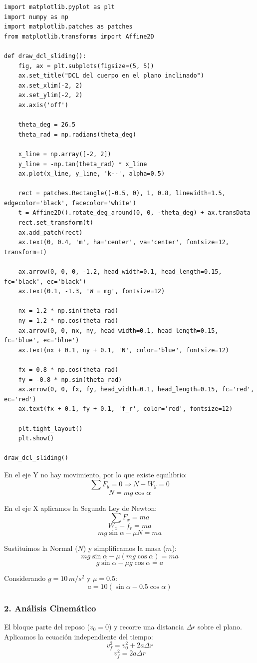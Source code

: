 \documentclass[12pt, a4paper]{article}
\begin{document}
\begin{lstlisting}
import matplotlib.pyplot as plt
import numpy as np
import matplotlib.patches as patches
from matplotlib.transforms import Affine2D

def draw_dcl_sliding():
    fig, ax = plt.subplots(figsize=(5, 5))
    ax.set_title("DCL del cuerpo en el plano inclinado")
    ax.set_xlim(-2, 2)
    ax.set_ylim(-2, 2)
    ax.axis('off')

    theta_deg = 26.5
    theta_rad = np.radians(theta_deg)

    x_line = np.array([-2, 2])
    y_line = -np.tan(theta_rad) * x_line
    ax.plot(x_line, y_line, 'k--', alpha=0.5)

    rect = patches.Rectangle((-0.5, 0), 1, 0.8, linewidth=1.5, edgecolor='black', facecolor='white')
    t = Affine2D().rotate_deg_around(0, 0, -theta_deg) + ax.transData
    rect.set_transform(t)
    ax.add_patch(rect)
    ax.text(0, 0.4, 'm', ha='center', va='center', fontsize=12, transform=t)

    ax.arrow(0, 0, 0, -1.2, head_width=0.1, head_length=0.15, fc='black', ec='black')
    ax.text(0.1, -1.3, 'W = mg', fontsize=12)

    nx = 1.2 * np.sin(theta_rad)
    ny = 1.2 * np.cos(theta_rad)
    ax.arrow(0, 0, nx, ny, head_width=0.1, head_length=0.15, fc='blue', ec='blue')
    ax.text(nx + 0.1, ny + 0.1, 'N', color='blue', fontsize=12)

    fx = 0.8 * np.cos(theta_rad)
    fy = -0.8 * np.sin(theta_rad)
    ax.arrow(0, 0, fx, fy, head_width=0.1, head_length=0.15, fc='red', ec='red')
    ax.text(fx + 0.1, fy + 0.1, 'f_r', color='red', fontsize=12)

    plt.tight_layout()
    plt.show()

draw_dcl_sliding()
\end{lstlisting}

En el eje Y no hay movimiento, por lo que existe equilibrio:
$$ \sum F_y = 0 \Rightarrow N - W_y = 0 $$
$$ N = mg \cos\alpha $$

En el eje X aplicamos la Segunda Ley de Newton:
$$ \sum F_x = ma $$
$$ W_x - f_r = ma $$
$$ mg \sin\alpha - \mu N = ma $$

Sustituimos la Normal ($N$) y simplificamos la masa ($m$):
$$ mg \sin\alpha - \mu (mg \cos\alpha) = ma $$
$$ g \sin\alpha - \mu g \cos\alpha = a $$

Considerando $g = 10 \, \si{m/s^2}$ y $\mu = 0.5$:
$$ a = 10 (\sin\alpha - 0.5 \cos\alpha) $$

\subsubsection*{2. Análisis Cinemático}
El bloque parte del reposo ($v_0 = 0$) y recorre una distancia $\Delta r$ sobre el plano. Aplicamos la ecuación independiente del tiempo:
$$ v_f^2 = v_0^2 + 2a \Delta r $$
$$ v_f^2 = 2a \Delta r $$
\end{document}
